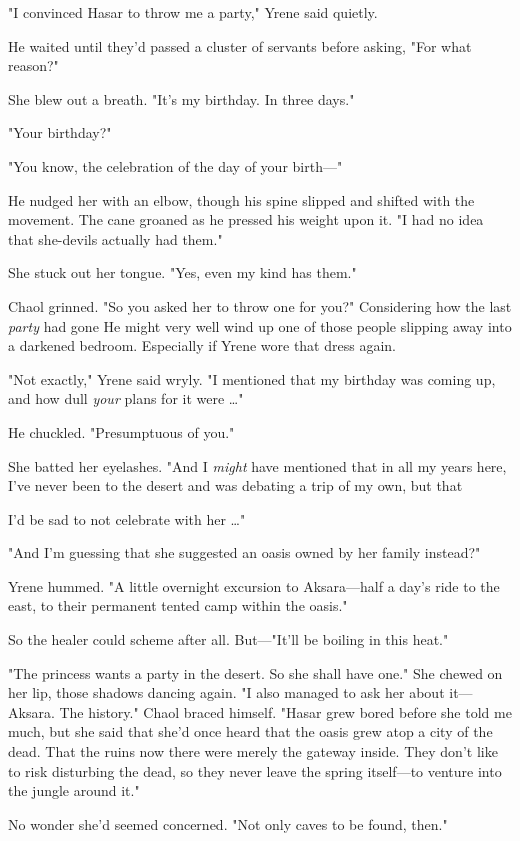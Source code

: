 "I convinced Hasar to throw me a party," Yrene said quietly.

He waited until they'd passed a cluster of servants before asking, "For what reason?"

She blew out a breath. "It's my birthday. In three days."

"Your birthday?"

"You know, the celebration of the day of your birth---"

He nudged her with an elbow, though his spine slipped and shifted with the movement. The cane groaned as he pressed his weight upon it. "I had no idea that she-devils actually had them."

She stuck out her tongue. "Yes, even my kind has them."

Chaol grinned. "So you asked her to throw one for you?" Considering how the last \emph{party} had gone  He might very well wind up one of those people slipping away into a darkened bedroom. Especially if Yrene wore that dress again.

"Not exactly," Yrene said wryly. "I mentioned that my birthday was coming up, and how dull \emph{your} plans for it were \ldots"

He chuckled. "Presumptuous of you."

She batted her eyelashes. "And I \emph{might} have mentioned that in all my years here, I've never been to the desert and was debating a trip of my own, but that

I'd be sad to not celebrate with her \ldots"

"And I'm guessing that she suggested an oasis owned by her family instead?"

Yrene hummed. "A little overnight excursion to Aksara---half a day's ride to the east, to their permanent tented camp within the oasis."

So the healer could scheme after all. But---"It'll be boiling in this heat."

"The princess wants a party in the desert. So she shall have one." She chewed on her lip, those shadows dancing again. "I also managed to ask her about it--- Aksara. The history." Chaol braced himself. "Hasar grew bored before she told me much, but she said that she'd once heard that the oasis grew atop a city of the dead. That the ruins now there were merely the gateway inside. They don't like to risk disturbing the dead, so they never leave the spring itself---to venture into the jungle around it."

No wonder she'd seemed concerned. "Not only caves to be found, then."

